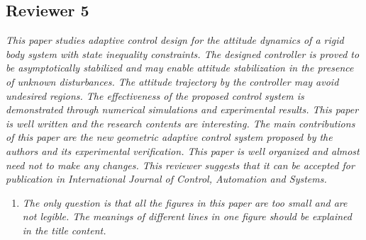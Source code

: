 \documentclass[11pt]{article}
\begin{document}
\subsection*{Reviewer 5}
\textit{This paper studies adaptive control design for the attitude dynamics of a rigid body system with state inequality constraints. The designed controller is proved to be asymptotically stabilized and may enable attitude stabilization in the presence of unknown disturbances. The attitude trajectory by the controller may avoid undesired regions. The effectiveness of the proposed control system is demonstrated through numerical simulations and experimental results. This paper is well written and the research contents are interesting. The main contributions of this paper are the new geometric adaptive control system proposed by the authors and its experimental verification. This paper is well organized and almost need not to make any changes. This reviewer suggests that it can be accepted for publication in International Journal of Control, Automation and Systems.}

\begin{enumerate}
\item \textit{The only question is that all the figures in this paper are too small and are not legible. The meanings of different lines in one figure should be explained in the title content.}
\end{enumerate}



\end{document}
